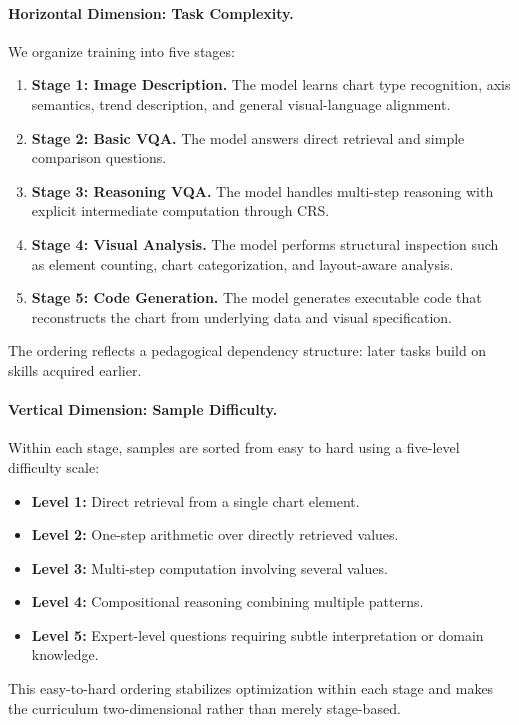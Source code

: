 \documentclass[journal]{IEEEtran}
\newcommand{\crs}{CRS}
\begin{document}
\paragraph{Horizontal Dimension: Task Complexity.}
We organize training into five stages:
\begin{enumerate}
    \item \textbf{Stage 1: Image Description.} The model learns chart type recognition, axis semantics, trend description, and general visual-language alignment.
    \item \textbf{Stage 2: Basic VQA.} The model answers direct retrieval and simple comparison questions.
    \item \textbf{Stage 3: Reasoning VQA.} The model handles multi-step reasoning with explicit intermediate computation through \crs{}.
    \item \textbf{Stage 4: Visual Analysis.} The model performs structural inspection such as element counting, chart categorization, and layout-aware analysis.
    \item \textbf{Stage 5: Code Generation.} The model generates executable code that reconstructs the chart from underlying data and visual specification.
\end{enumerate}
The ordering reflects a pedagogical dependency structure: later tasks build on skills acquired earlier.

\paragraph{Vertical Dimension: Sample Difficulty.}
Within each stage, samples are sorted from easy to hard using a five-level difficulty scale:
\begin{itemize}
    \item \textbf{Level 1:} Direct retrieval from a single chart element.
    \item \textbf{Level 2:} One-step arithmetic over directly retrieved values.
    \item \textbf{Level 3:} Multi-step computation involving several values.
    \item \textbf{Level 4:} Compositional reasoning combining multiple patterns.
    \item \textbf{Level 5:} Expert-level questions requiring subtle interpretation or domain knowledge.
\end{itemize}
This easy-to-hard ordering stabilizes optimization within each stage and makes the curriculum two-dimensional rather than merely stage-based.
\end{document}
